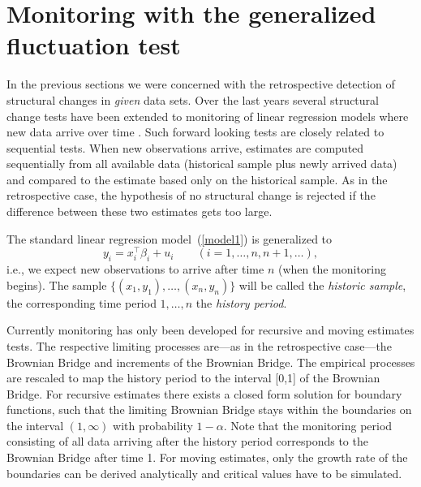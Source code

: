 \documentclass[10pt,a4paper]{article}
\begin{document}
\section{Monitoring with the generalized fluctuation test}
\label{sec:monitor}

In the previous sections we were concerned with the retrospective detection
of structural changes in \emph{given} data sets. Over the last years
several structural change tests have been extended to monitoring
of linear regression models where new data arrive over time
\citep{Z:Chu+Stinchcombe+White:1996,Z:Leisch+Hornik+Kuan:2000}. Such
forward looking tests are closely related to sequential tests. When
new observations arrive, estimates are computed sequentially from all
available data (historical sample plus newly arrived data) and compared
to the estimate based only on the historical sample. As in the
retrospective case, the hypothesis of no structural change is
rejected if the difference between these two estimates gets too large.

The standard linear regression model~(\ref{model1}) is generalized to
\begin{equation}
  y_i = x_i^\top \beta_i + u_i
  \qquad (i = 1, \dots, n, n+1, \ldots),
\end{equation}
i.e., we expect new observations to arrive after time $n$ (when the
monitoring begins). The sample $\{(x_1,y_1),\ldots,(x_n,y_n)\}$ will
be called the \emph{historic sample}, the corresponding time period
$1,\ldots,n$ the \emph{history period}.

Currently monitoring has only been developed for recursive
\citep{Z:Chu+Stinchcombe+White:1996} and moving
\citep{Z:Leisch+Hornik+Kuan:2000} estimates tests. The respective
limiting processes are---as in the retrospective case---the Brownian
Bridge and increments of the Brownian Bridge. The empirical
processes are rescaled to map the history period to the interval [0,1]
of the Brownian Bridge. For recursive estimates there exists a closed
form solution for boundary functions, such that the limiting Brownian
Bridge stays within the boundaries on the interval $(1,\infty)$ with
probability $1-\alpha$. Note that the monitoring period consisting of
all data arriving after the history period corresponds to the Brownian
Bridge after time 1. For moving estimates, only the growth rate of the
boundaries can be derived analytically and critical values have to be
simulated.
\end{document}

